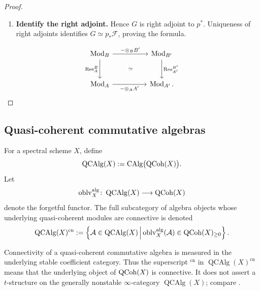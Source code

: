 \begin{proof}
\begin{enumerate}[label=\textup{(\arabic*)}]
    \item \textbf{Identify the right adjoint.}
    Hence \(G\) is right adjoint to \(p^*\). Uniqueness of right adjoints
    identifies \(G\simeq p_*\mathcal F\), proving the formula.
\end{enumerate}
\[
\begin{tikzcd}[column sep=huge, row sep=large]
    \Mod_B
        \arrow[r, "{-\otimes_BB'}"]
        \arrow[d, "{\operatorname{Res}_A^B}"']
        \arrow[dr, phantom, "\scriptstyle\simeq" description]
    &
    \Mod_{B'}
        \arrow[d, "{\operatorname{Res}_{A'}^{B'}}"]
    \\
    \Mod_A
        \arrow[r, "{-\otimes_AA'}"']
    &
    \Mod_{A'}.
\end{tikzcd}
\]
\end{proof}




\subsection{Quasi-coherent commutative algebras}

\begin{definition}
\label{def:quasi-coherent-commutative-algebra}
For a spectral scheme \(X\), define
\[
    \operatorname{QCAlg}(X)
    :=
    \operatorname{CAlg}\bigl(\operatorname{QCoh}(X)\bigr).
\]
Let
\[
    \operatorname{oblv}^{\mathrm{alg}}_{X}
    \colon
    \operatorname{QCAlg}(X)
    \longrightarrow
    \operatorname{QCoh}(X)
\]
denote the forgetful functor. The full subcategory of algebra objects
whose underlying quasi-coherent modules are connective is denoted
\[
    \operatorname{QCAlg}(X)^{\mathrm{cn}}
    :=
    \left\{
        \mathcal A
        \in
        \operatorname{QCAlg}(X)
        \,\middle|\,
        \operatorname{oblv}^{\mathrm{alg}}_{X}(\mathcal A)
        \in
        \operatorname{QCoh}(X)_{\geq0}
    \right\}.
\]
\end{definition}

\begin{remark}
\label{rem:qcalg-connectivity-not-t-structure}
Connectivity of a quasi-coherent commutative algebra is measured in the
underlying stable coefficient category. Thus the superscript
\({}^{\mathrm{cn}}\) in
\(\operatorname{QCAlg}(X)^{\mathrm{cn}}\) means that the underlying object
of \(\operatorname{QCoh}(X)\) is connective. It does not assert a $t$-structure on the
generally nonstable $\infty$-category \(\operatorname{QCAlg}(X)\); compare
.
\end{remark}

